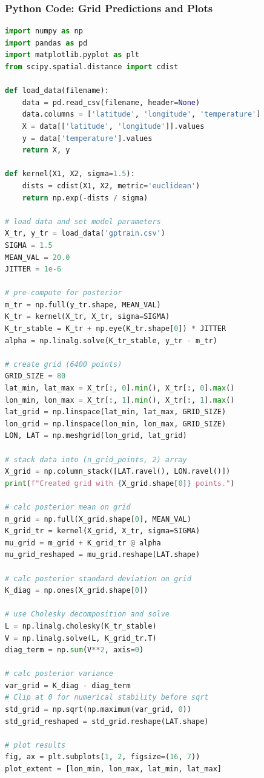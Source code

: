 \documentclass{article}
\begin{document}
\subsubsection*{Python Code: Grid Predictions and Plots}
\begin{lstlisting}[language=Python]
import numpy as np
import pandas as pd
import matplotlib.pyplot as plt
from scipy.spatial.distance import cdist

def load_data(filename):
    data = pd.read_csv(filename, header=None)
    data.columns = ['latitude', 'longitude', 'temperature']
    X = data[['latitude', 'longitude']].values
    y = data['temperature'].values
    return X, y

def kernel(X1, X2, sigma=1.5):
    dists = cdist(X1, X2, metric='euclidean')
    return np.exp(-dists / sigma)

# load data and set model parameters
X_tr, y_tr = load_data('gptrain.csv')
SIGMA = 1.5
MEAN_VAL = 20.0
JITTER = 1e-6

# pre-compute for posterior
m_tr = np.full(y_tr.shape, MEAN_VAL)
K_tr = kernel(X_tr, X_tr, sigma=SIGMA)
K_tr_stable = K_tr + np.eye(K_tr.shape[0]) * JITTER
alpha = np.linalg.solve(K_tr_stable, y_tr - m_tr)

# create grid (6400 points)
GRID_SIZE = 80 
lat_min, lat_max = X_tr[:, 0].min(), X_tr[:, 0].max()
lon_min, lon_max = X_tr[:, 1].min(), X_tr[:, 1].max()
lat_grid = np.linspace(lat_min, lat_max, GRID_SIZE)
lon_grid = np.linspace(lon_min, lon_max, GRID_SIZE)
LON, LAT = np.meshgrid(lon_grid, lat_grid)

# stack data into (n_grid_points, 2) array
X_grid = np.column_stack([LAT.ravel(), LON.ravel()])
print(f"Created grid with {X_grid.shape[0]} points.")

# calc posterior mean on grid
m_grid = np.full(X_grid.shape[0], MEAN_VAL)
K_grid_tr = kernel(X_grid, X_tr, sigma=SIGMA)
mu_grid = m_grid + K_grid_tr @ alpha
mu_grid_reshaped = mu_grid.reshape(LAT.shape)

# calc posterior standard deviation on grid
K_diag = np.ones(X_grid.shape[0]) 

# use Cholesky decomposition and solve
L = np.linalg.cholesky(K_tr_stable) 
V = np.linalg.solve(L, K_grid_tr.T) 
diag_term = np.sum(V**2, axis=0) 

# calc posterior variance
var_grid = K_diag - diag_term
# Clip at 0 for numerical stability before sqrt
std_grid = np.sqrt(np.maximum(var_grid, 0)) 
std_grid_reshaped = std_grid.reshape(LAT.shape)

# plot results
fig, ax = plt.subplots(1, 2, figsize=(16, 7))
plot_extent = [lon_min, lon_max, lat_min, lat_max]


\end{lstlisting}
\end{document}
